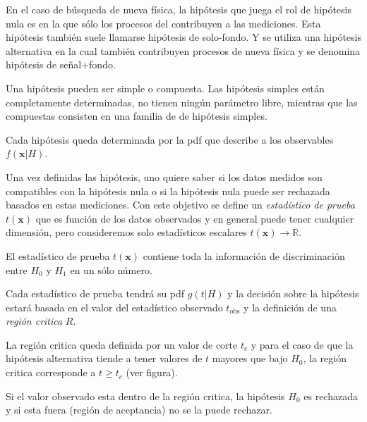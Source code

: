 En el caso de búsqueda de nueva física, la hipótesis que juega el rol de hipótesis nula es en la que
s\'olo los procesos del {\SM} contribuyen a las mediciones. Esta hipótesis también suele llamarse
hipótesis de solo-fondo. Y se utiliza una hipótesis alternativa en la cual también contribuyen procesos
de nueva física y se denomina hipótesis de se\~nal+fondo.

Una hipótesis pueden ser simple o compuesta. Las hipótesis simples están completamente determinadas,
no tienen ningún parámetro libre, mientras que las compuestas consisten en una familia de de hipótesis
simples.

Cada hipótesis queda determinada por la pdf que describe a los observables $f(\bm{x}|H)$.

Una vez definidas las hipótesis, uno quiere saber si los datos medidos son compatibles con la hipótesis
nula o si la hipótesis nula puede ser rechazada basados en estas mediciones. Con este objetivo se define
un \emph{estadístico de prueba} $t(\bm{x})$ que es función de los datos observados y en general puede tener
cualquier dimensión, pero consideremos solo estadísticos escalares $t(\bm{x}) \to \mathbb{R}$.

El estadístico de prueba  $t(\bm{x})$ contiene toda la información de discriminación entre $H_0$ y $H_1$
en un s\'olo número. %

Cada estadístico de prueba tendrá su pdf $g(t|H)$ y la decisión sobre la hipótesis estará basada
en el valor del estadístico observado $t_\text{obs}$ y la definición de una \emph{región critica} $R$.

La región critica queda definida por un valor de corte $t_c$ y para el caso de que la hipótesis
alternativa tiende a tener valores de $t$ mayores que bajo $H_0$, la región critica corresponde a
$t \geq t_c$ (ver figura).

Si el valor observado esta dentro de la región critica, la hipótesis $H_0$ es rechazada y si esta
fuera (región de aceptancia) no se la puede rechazar.

\begin{figure}[h]
  \centering
  
\end{figure}


